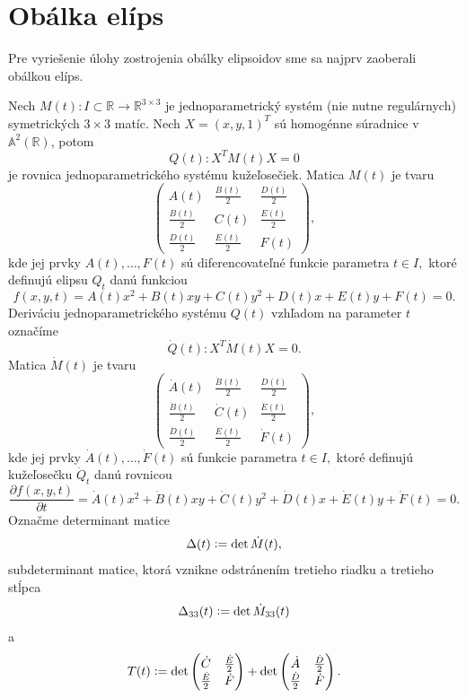 \section{Obálka elíps}
Pre vyriešenie úlohy zostrojenia obálky elipsoidov sme sa najprv zaoberali obálkou elíps.

Nech $M(t) \colon I \subset \mathbb{R} \rightarrow \mathbb{R}^{3 \times 3}$ je jednoparametrický systém (nie nutne regulárnych) symetrických $3 \times 3$ matíc. Nech $ X = (x, y, 1)^T$ sú homogénne súradnice v $\mathbb{A}^2(\mathbb{R})$, potom
\begin{equation*}
Q(t) \colon X^T M(t) X = 0 
\end{equation*}
je rovnica jednoparametrického systému kužeľosečiek. 
Matica $M(t)$ je tvaru
$$
\left(\begin{matrix} 
A(t) & \frac{B(t)}{2} & \frac{D(t)}{2} \\
\frac{B(t)}{2} & C(t) & \frac{E(t)}{2} \\
\frac{D(t)}{2} & \frac{E(t)}{2} & F(t) 
\end{matrix} \right),
$$
kde jej prvky $A(t), \dots, F(t)$ sú diferencovateľné funkcie parametra $t \in I,$ ktoré definujú elipsu $Q_t$ danú funkciou 
$$f(x, y, t) = A(t)x^2 + B(t)xy + C(t)y^2 + D(t)x + E(t)y + F(t) = 0.$$
Deriváciu jednoparametrického systému $Q(t)$ vzhľadom na parameter $t$ označíme
\begin{equation*}
\dot{Q}(t) \colon X^T \dot{M}(t) X = 0.
\end{equation*}
Matica $\dot{M}(t)$ je tvaru
$$
\left(\begin{matrix} 
\dot{A}(t) & \frac{\dot{B}(t)}{2} & \frac{\dot{D}(t)}{2} \\
\frac{\dot{B}(t)}{2} & \dot{C}(t) & \frac{\dot{E}(t)}{2} \\
\frac{\dot{D}(t)}{2} & \frac{\dot{E}(t)}{2} & \dot{F}(t) 
\end{matrix} \right),
$$
kde jej prvky $\dot{A}(t), \dots, \dot{F}(t)$ sú funkcie parametra $t \in I,$ ktoré definujú kužeľosečku $\dot{Q}_t$ danú rovnicou 
$$\dfrac{\partial f(x, y, t)}{\partial t} = \dot{A}(t)x^2 + \dot{B}(t)xy + \dot{C}(t)y^2 + \dot{D}(t)x + \dot{E}(t)y + \dot{F}(t) = 0.$$
Označme determinant matice 
$$\Delta(t) \vcentcolon = \det \dot{M}(t), $$
subdeterminant matice, ktorá vznikne odstránením tretieho riadku a tretieho stĺpca 
$$\Delta_{33}(t) \vcentcolon = \det \dot{M}_{33}(t)$$
a $$
T(t) \vcentcolon = \det \left( \begin{matrix}
\dot{C} & \frac{\dot{E}}{2} \\ 
\frac{\dot{E}}{2} & \dot{F}
\end{matrix} \right) + \det \left( \begin{matrix}
\dot{A} & \frac{\dot{D}}{2} \\ 
\frac{\dot{D}}{2} & \dot{F}
\end{matrix} \right).
$$


